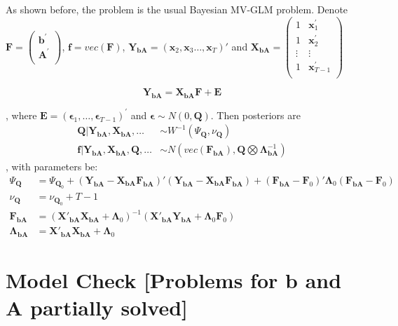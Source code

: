 \documentclass[]{article}
\begin{document}
As shown before, the problem is the usual Bayesian MV-GLM problem. Denote \(\mathbf{F} = \begin{pmatrix}
	\mathbf{b}^{'} \\
	\mathbf{A}^{'} \\
\end{pmatrix}\), \(\mathbf{f} = vec(\mathbf{F})\), \(\mathbf{Y}_\mathbf{bA} = (\mathbf{x}_{2}, \mathbf{x}_{3} \ldots, \mathbf{x}_{T})'\) and \(\mathbf{X}_\mathbf{bA} = \begin{pmatrix}
1 & \mathbf{x}_{1}^{'} \\
1 & \mathbf{x}_{2}^{'} \\
\vdots & \vdots \\
1 & \mathbf{x}_{T - 1}^{'} \\
\end{pmatrix}\)

\[\mathbf{Y}_\mathbf{bA} = \mathbf{X}_\mathbf{bA}\mathbf{F}+ \mathbf{E}\]

, where
\(\mathbf{E} = \left( \mathbf{\epsilon}_{1},\ldots,\mathbf{\epsilon}_{T - 1} \right)^{'}\) and \(\mathbf{\epsilon} \sim N(0,\mathbf{Q})\). Then posteriors are
\begin{align*}
	\mathbf{Q}|\mathbf{Y}_{\mathbf{\text{bA}}},\mathbf{X}_{\mathbf{\text{bA}}},\ldots &\sim W^{-1}(\Psi_{\mathbf{Q}}, \nu_{\mathbf{Q}})\\
	\mathbf{f}|\mathbf{Y}_{\mathbf{\text{bA}}},\mathbf{X}_{\mathbf{\text{bA}}},\mathbf{Q},\ldots &\sim N(vec(\mathbf{F}_\mathbf{bA}),  \mathbf{Q}\bigotimes \bm{\Lambda}_\mathbf{bA}^{-1})
\end{align*}
, with parameters be:
\begin{align*}
	\Psi_{\mathbf{Q}} &= \Psi_{\mathbf{Q}_{0}} + (\mathbf{Y}_\mathbf{bA} - \mathbf{X}_\mathbf{bA}\mathbf{F}_\mathbf{bA})'(\mathbf{Y}_\mathbf{bA} - \mathbf{X}_\mathbf{bA}\mathbf{F}_\mathbf{bA}) + (\mathbf{F}_\mathbf{bA} - \mathbf{F}_0)'\bm{\Lambda}_0(\mathbf{F}_\mathbf{bA} - \mathbf{F}_0)\\
	\nu_{\mathbf{Q}} &= \nu_{\mathbf{Q}_{0}} + T - 1\\
	\mathbf{F}_\mathbf{bA} &= (\mathbf{X}'_\mathbf{bA}\mathbf{X}_\mathbf{bA} + \bm{\Lambda}_0)^{-1}(\mathbf{X}'_\mathbf{bA}\mathbf{Y}_\mathbf{bA} + \bm{\Lambda}_0\mathbf{F}_0)\\
	\bm{\Lambda}_\mathbf{bA} &= \mathbf{X}'_\mathbf{bA}\mathbf{X}_\mathbf{bA} + \bm{\Lambda}_0
\end{align*}


\section{Model Check [Problems for \(\mathbf{b}\) and \(\mathbf{A}\) partially solved]} \label{problems}
\end{document}
